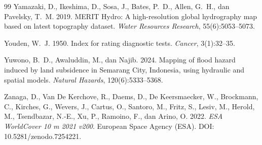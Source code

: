 \documentclass[12pt,a4paper]{article}
\begin{document}
\begin{thebibliography}{99}
 Yamazaki, D., Ikeshima, D., Sosa, J., Bates, P.~D., Allen, G.~H., dan Pavelsky, T.~M. 2019. MERIT Hydro: A high-resolution global hydrography map based on latest topography dataset. \textit{Water Resources Research}, 55(6):5053--5073.

 Youden, W.~J. 1950. Index for rating diagnostic tests. \textit{Cancer}, 3(1):32--35.

 Yuwono, B.~D., Awaluddin, M., dan Najib. 2024. Mapping of flood hazard induced by land subsidence in Semarang City, Indonesia, using hydraulic and spatial models. \textit{Natural Hazards}, 120(6):5333--5368.

 Zanaga, D., Van De Kerchove, R., Daems, D., De Keersmaecker, W., Brockmann, C., Kirches, G., Wevers, J., Cartus, O., Santoro, M., Fritz, S., Lesiv, M., Herold, M., Tsendbazar, N.-E., Xu, P., Ramoino, F., dan Arino, O. 2022. \textit{ESA WorldCover 10 m 2021 v200}. European Space Agency (ESA). DOI: 10.5281/zenodo.7254221.

\end{thebibliography}
\endgroup
\end{document}
